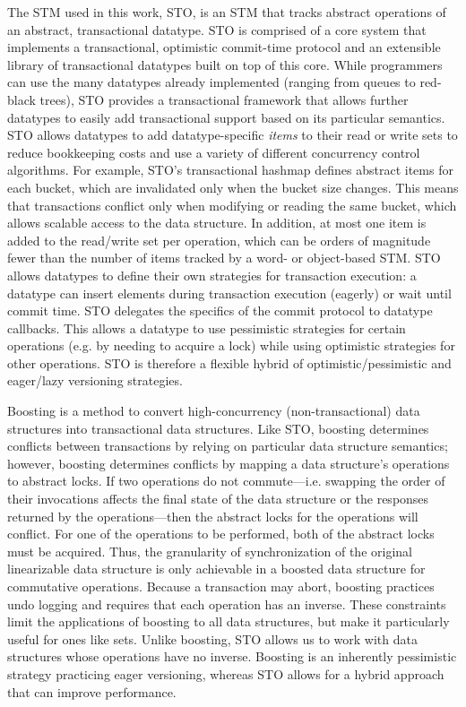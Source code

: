 The STM used in this work, STO\cite{sto}, is an STM that tracks abstract operations of an abstract, transactional datatype. STO is comprised of a core system that implements a transactional, optimistic commit-time protocol and an extensible library of transactional datatypes built on top of this core. While programmers can use the many datatypes already implemented (ranging from queues to red-black trees), STO provides a transactional framework that allows further datatypes to easily add transactional support based on its particular semantics. STO allows datatypes to add datatype-specific \emph{items} to their read or write sets to reduce bookkeeping costs and use a variety of different concurrency control algorithms. For example, STO's transactional hashmap defines abstract items for each bucket, which are invalidated only when the bucket size changes. This means that transactions conflict only when modifying or reading the same bucket, which allows scalable access to the data structure. In addition, at most one item is added to the read/write set per operation, which can be orders of magnitude fewer than the number of items tracked by a word- or object-based STM. STO allows datatypes to define their own strategies for transaction execution: a datatype can insert elements during transaction execution (eagerly) or wait until commit time. STO delegates the specifics of the commit protocol to datatype callbacks. This allows a datatype to use pessimistic strategies for certain operations (e.g. by needing to acquire a lock) while using optimistic strategies for other operations. STO is therefore a flexible hybrid of optimistic/pessimistic and eager/lazy versioning strategies.

Boosting\cite{boost} is a method to convert high-concurrency (non-transactional) data structures into transactional data structures. Like STO, boosting determines conflicts between transactions by relying on particular data structure semantics; however, boosting determines conflicts by mapping a data structure's operations to abstract locks. If two operations do not commute---i.e. swapping the order of their invocations affects the final state of the data structure or the responses returned by the operations---then the abstract locks for the operations will conflict. For one of the operations to be performed, both of the abstract locks must be acquired. Thus, the granularity of synchronization of the original linearizable data structure is only achievable in a boosted data structure for commutative operations. Because a transaction may abort, boosting practices undo logging and requires that each operation has an inverse. These constraints limit the applications of boosting to all data structures, but make it particularly useful for ones like sets. Unlike boosting, STO allows us to work with data structures whose operations have no inverse. Boosting is an inherently pessimistic strategy practicing eager versioning, whereas STO allows for a hybrid approach that can improve performance.

